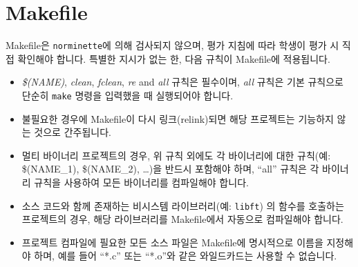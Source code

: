 \documentclass{42-ko}
\begin{document}
    \section{Makefile}

            Makefile은 \texttt{norminette}에 의해 검사되지 않으며, 평가 지침에 따라
            학생이 평가 시 직접 확인해야 합니다. 특별한 지시가 없는 한, 다음
            규칙이 Makefile에 적용됩니다.
            \begin{itemize}

                \item \textit{\$(NAME)}, \textit{clean}, \textit{fclean},
                  \textit{re} and \textit{all} 규칙은 필수이며, \textit{all}
                  규칙은 기본 규칙으로 단순히 \texttt{make} 명령을 입력했을 때
                  실행되어야 합니다.

                \item 불필요한 경우에 Makefile이 다시 링크(relink)되면 해당
                  프로젝트는 기능하지 않는 것으로 간주됩니다.

                \item 멀티 바이너리 프로젝트의 경우, 위 규칙 외에도 각 바이너리에
                  대한 규칙(예: \$(NAME\_1), \$(NAME\_2), …)을 반드시 포함해야
                  하며, ``all'' 규칙은 각 바이너리 규칙을 사용하여 모든 바이너리를
                  컴파일해야 합니다.

                  \item 소스 코드와 함께 존재하는 비시스템 라이브러리(예: \texttt{libft}) 의
                    함수를 호출하는 프로젝트의 경우, 해당 라이브러리를 Makefile에서
                    자동으로 컴파일해야 합니다.

                  \item 프로젝트 컴파일에 필요한 모든 소스 파일은 Makefile에
                    명시적으로 이름을 지정해야 하며, 예를 들어 ``*.c'' 또는
                    ``*.o''와 같은 와일드카드는 사용할 수 없습니다.

            \end{itemize}
\end{document}

